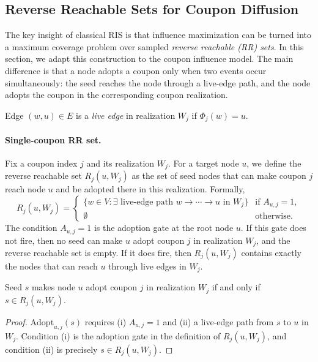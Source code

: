 \documentclass[sigconf]{acmart}
\begin{document}
\subsection{Reverse Reachable Sets for Coupon Diffusion}

The key insight of classical RIS is that influence maximization can be
turned into a maximum coverage problem over sampled \emph{reverse
reachable (RR) sets}.
In this section, we adapt this construction to the coupon influence
model.
The main difference is that a node adopts a coupon only when two
events occur simultaneously: the seed reaches the node through a
live-edge path, and the node adopts the coupon in the corresponding
coupon realization.

\begin{definition}
Edge $(w,u) \in E$ is a \emph{live edge} in realization $W_j$ if\/
$\Phi_j(w)=u$.
\end{definition}

\paragraph{Single-coupon RR set.}
Fix a coupon index $j$ and its realization $W_j$.
For a target node $u$, we define the reverse reachable set
$R_j(u,W_j)$ as the set of seed nodes that can make coupon $j$ reach
node $u$ and be adopted there in this realization.
Formally,
\[
  R_j(u, W_j) =
  \begin{cases}
    \{w \in V : \exists \text{ live-edge path } w \to \cdots \to u
      \text{ in } W_j\} & \text{if } A_{u,j} = 1, \\
    \emptyset & \text{otherwise.}
  \end{cases}
\]
The condition $A_{u,j}=1$ is the adoption gate at the root node $u$.
If this gate does not fire, then no seed can make $u$ adopt coupon $j$
in realization $W_j$, and the reverse reachable set is empty.
If it does fire, then $R_j(u,W_j)$ contains exactly the nodes that can
reach $u$ through live edges in $W_j$.

\begin{lemma}
\label{lem:coverage}
Seed $s$ makes node $u$ adopt coupon $j$ in realization $W_j$ if and only
if $s \in R_j(u, W_j)$.
\end{lemma}

\begin{proof}
$\mathrm{Adopt}_{u,j}(s)$ requires (i) $A_{u,j} = 1$ and (ii) a
live-edge path from $s$ to $u$ in $W_j$.
Condition (i) is the adoption gate in the definition of $R_j(u,W_j)$,
and condition (ii) is precisely $s \in R_j(u, W_j)$.
\end{proof}
\end{document}
